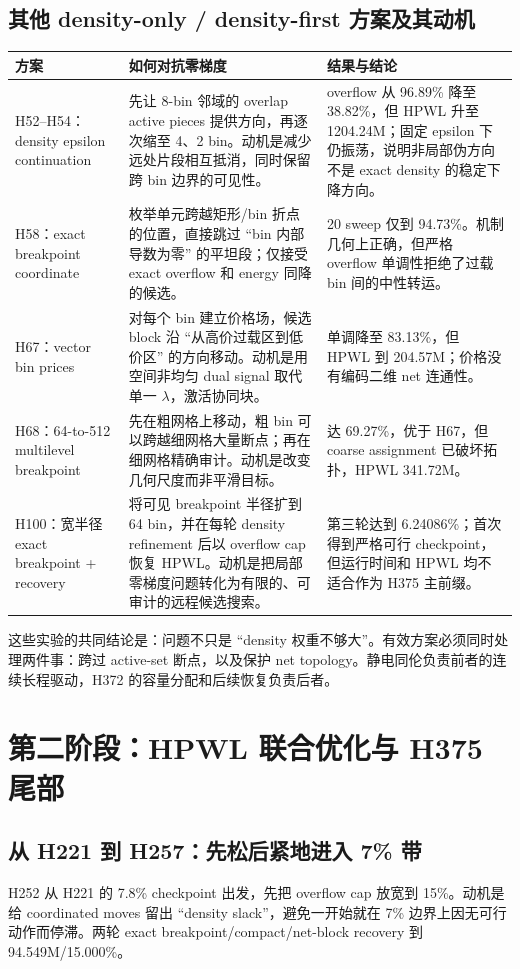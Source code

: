 \documentclass[UTF8,a4paper,11pt]{ctexrep}
\begin{document}
\section{其他 density-only / density-first 方案及其动机}
\begin{longtable}{p{2.3cm}p{4.8cm}p{4.4cm}}
\toprule 方案 & 如何对抗零梯度 & 结果与结论\\\midrule\endhead
H52--H54：density epsilon continuation & 先让 8-bin 邻域的 overlap active pieces 提供方向，再逐次缩至 4、2 bin。动机是减少远处片段相互抵消，同时保留跨 bin 边界的可见性。 & overflow 从 96.89\% 降至 38.82\%，但 HPWL 升至 1204.24M；固定 epsilon 下仍振荡，说明非局部伪方向不是 exact density 的稳定下降方向。\\
H58：exact breakpoint coordinate & 枚举单元跨越矩形/bin 折点的位置，直接跳过 ``bin 内部导数为零'' 的平坦段；仅接受 exact overflow 和 energy 同降的候选。 & 20 sweep 仅到 94.73\%。机制几何上正确，但严格 overflow 单调性拒绝了过载 bin 间的中性转运。\\
H67：vector bin prices & 对每个 bin 建立价格场，候选 block 沿 ``从高价过载区到低价区'' 的方向移动。动机是用空间非均匀 dual signal 取代单一 $\lambda$，激活协同块。 & 单调降至 83.13\%，但 HPWL 到 204.57M；价格没有编码二维 net 连通性。\\
H68：64-to-512 multilevel breakpoint & 先在粗网格上移动，粗 bin 可以跨越细网格大量断点；再在细网格精确审计。动机是改变几何尺度而非平滑目标。 & 达 69.27\%，优于 H67，但 coarse assignment 已破坏拓扑，HPWL 341.72M。\\
H100：宽半径 exact breakpoint + recovery & 将可见 breakpoint 半径扩到 64 bin，并在每轮 density refinement 后以 overflow cap 恢复 HPWL。动机是把局部零梯度问题转化为有限的、可审计的远程候选搜索。 & 第三轮达到 6.24086\%；首次得到严格可行 checkpoint，但运行时间和 HPWL 均不适合作为 H375 主前缀。\\
\bottomrule
\end{longtable}
这些实验的共同结论是：问题不只是 ``density 权重不够大''。有效方案必须同时处理两件事：跨过 active-set 断点，以及保护 net topology。静电同伦负责前者的连续长程驱动，H372 的容量分配和后续恢复负责后者。

\chapter{第二阶段：HPWL 联合优化与 H375 尾部}
\section{从 H221 到 H257：先松后紧地进入 7\% 带}
H252 从 H221 的 7.8\% checkpoint 出发，先把 overflow cap 放宽到 15\%。动机是给 coordinated moves 留出 ``density slack''，避免一开始就在 7\% 边界上因无可行动作而停滞。两轮 exact breakpoint/compact/net-block recovery 到 94.549M/15.000\%。
\end{document}
